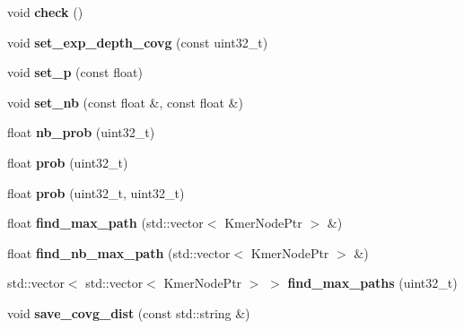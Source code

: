 \begin{DoxyCompactItemize}
void {\bfseries check} ()
\item 
\mbox{\label{classKmerGraph_a4049a0d9e38244d96d9f59988ae416ba}} 
void {\bfseries set\+\_\+exp\+\_\+depth\+\_\+covg} (const uint32\+\_\+t)
\item 
\mbox{\label{classKmerGraph_a2a5e7227b0ae1f9ef92ddb5a2b2050d0}} 
void {\bfseries set\+\_\+p} (const float)
\item 
\mbox{\label{classKmerGraph_af4c963babbce09829a20d8e96bfa8459}} 
void {\bfseries set\+\_\+nb} (const float \&, const float \&)
\item 
\mbox{\label{classKmerGraph_a4e9c97f44d6e95ac7d0c1450b08d36f7}} 
float {\bfseries nb\+\_\+prob} (uint32\+\_\+t)
\item 
\mbox{\label{classKmerGraph_aa55bd194e4cd31171926733a6177b140}} 
float {\bfseries prob} (uint32\+\_\+t)
\item 
\mbox{\label{classKmerGraph_a4989eaddd30f1a876d87b3ea12d64dfa}} 
float {\bfseries prob} (uint32\+\_\+t, uint32\+\_\+t)
\item 
\mbox{\label{classKmerGraph_ad1223d274d5c2f49d48444d23fa5c983}} 
float {\bfseries find\+\_\+max\+\_\+path} (std\+::vector$<$ Kmer\+Node\+Ptr $>$ \&)
\item 
\mbox{\label{classKmerGraph_a5c4464b2ed6fb79172d5b31a8f7113c4}} 
float {\bfseries find\+\_\+nb\+\_\+max\+\_\+path} (std\+::vector$<$ Kmer\+Node\+Ptr $>$ \&)
\item 
\mbox{\label{classKmerGraph_acce921a71fef4cb61d63bf5b05ea0b8f}} 
std\+::vector$<$ std\+::vector$<$ Kmer\+Node\+Ptr $>$ $>$ {\bfseries find\+\_\+max\+\_\+paths} (uint32\+\_\+t)
\item 
\mbox{\label{classKmerGraph_ab5c89f1d5b06517b3c4f2ee38e9de734}} 
void {\bfseries save\+\_\+covg\+\_\+dist} (const std\+::string \&)
\item 
\mbox{\label{classKmerGraph_ac8f04bea0c4b151bbc86f4de52b1147a}} 

\end{DoxyCompactItemize}
